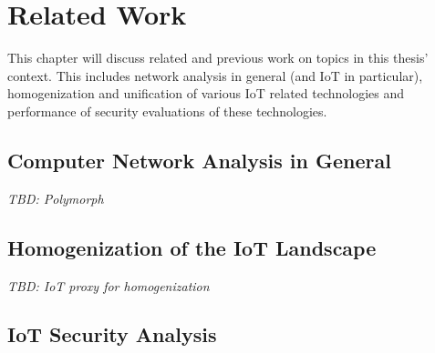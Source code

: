 \chapter{Related Work}
\label{chap:related-work}
This chapter will discuss related and previous work on topics in this thesis' context. This includes network analysis in general (and \ac{IoT} in particular), homogenization and unification of various \ac{IoT} related technologies and performance of security evaluations of these technologies.

\section{Computer Network Analysis in General}
\label{sec:computer-network-analysis}
\emph{TBD: Polymorph \cite{ramos_2018}}

\section{Homogenization of the IoT Landscape}
\label{sec:homogenization}
\emph{TBD: IoT proxy for homogenization \cite{wenquan2018proxy}} %

\section{IoT Security Analysis}
\label{sec:security-analysis}

